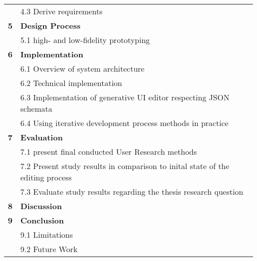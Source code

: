 {\begin{tabularx}{\textwidth}{@{} r Y @{}}
    & 4.3 Derive requirements\vspace{2mm}\\
	\textbf{5}
	& \textbf{Design Process}\vspace{2mm}\\
    & 5.1 high- and low-fidelity prototyping\vspace{2mm}\\
	\textbf{6}
	& \textbf{Implementation}\vspace{2mm}\\
    & 6.1 Overview of system architecture\vspace{2mm}\\
    & 6.2 Technical implementation\vspace{2mm}\\
    & 6.3 Implementation of generative UI editor respecting JSON schemata\vspace{2mm}\\
    & 6.4 Using iterative development process methods in practice\vspace{2mm}\\
	\textbf{7}
	& \textbf{Evaluation}\vspace{2mm}\\
    & 7.1 present final conducted User Research methods\vspace{2mm}\\
    & 7.2 Present study results in comparison to inital state of the editing process\vspace{2mm}\\
    & 7.3 Evaluate study results regarding the thesis research question\vspace{2mm}\\
	\textbf{8}
	& \textbf{Discussion}\vspace{2mm}\\
	\textbf{9}
	& \textbf{Conclusion}\vspace{2mm}\\
    & 9.1 Limitations\vspace{2mm}\\
    & 9.2 Future Work\vspace{2mm}\\
\end{tabularx}
}